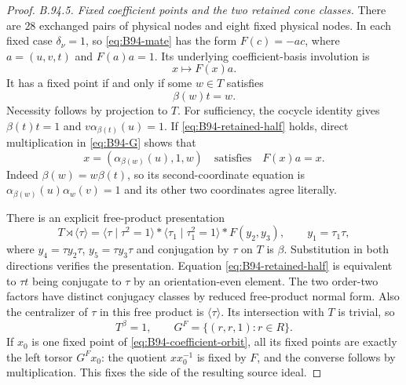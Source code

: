 \begin{proof}
\emph{B.94.5. Fixed coefficient points and the two retained cone classes.}
There are $28$ exchanged pairs of physical nodes and eight
fixed physical nodes. In each fixed case $\delta_\nu=1$,
so \eqref{eq:B94-mate} has the form $F(c)=-a c$, where
$a=(u,v,t)$ and $F(a)a=1$. Its underlying coefficient-basis
involution is
\begin{equation}\label{eq:B94-coefficient-orbit}
                              x\longmapsto F(x)a.
\end{equation}
It has a fixed point if and only if some $w\in T$ satisfies
\begin{equation}\label{eq:B94-retained-half}
                              \beta(w)t=w.
\end{equation}
Necessity follows by projection to $T$. For sufficiency, the
cocycle identity gives
$\beta(t)t=1$ and $v\alpha_{\beta(t)}(u)=1$.
If \eqref{eq:B94-retained-half} holds, direct multiplication
in \eqref{eq:B94-G} shows that
\[
                              x=(\alpha_{\beta(w)}(u),1,w)
                              \quad\text{satisfies}\quad F(x)a=x.
\]
Indeed $\beta(w)=w\beta(t)$, so its second-coordinate equation
is $\alpha_{\beta(w)}(u)\alpha_w(v)=1$ and its other two
coordinates agree literally.

There is an explicit free-product presentation
\begin{equation}\label{eq:B94-retained-orbifold}
 T\rtimes\langle\tau\rangle
    =\langle\tau\mid\tau^2=1\rangle*
      \langle\tau_1\mid\tau_1^2=1\rangle*F(y_2,y_3),
 \qquad y_1=\tau_1\tau,
\end{equation}
where $y_4=\tau y_2\tau$, $y_5=\tau y_3\tau$ and conjugation
by $\tau$ on $T$ is $\beta$. Substitution in both directions
verifies the presentation. Equation \eqref{eq:B94-retained-half}
is equivalent to $\tau t$ being conjugate to $\tau$ by an
orientation-even element. The two order-two factors have
distinct conjugacy classes by reduced free-product normal form.
Also the centralizer of $\tau$ in this free product is
$\langle\tau\rangle$. Its intersection with $T$ is trivial,
so
\begin{equation}\label{eq:B94-fixed-G}
                    T^\beta=1,
                    \qquad G^F=\{(r,r,1):r\in R\}.
\end{equation}
If $x_0$ is one fixed point of \eqref{eq:B94-coefficient-orbit},
all its fixed points are exactly the left torsor $G^F x_0$:
the quotient $x x_0^{-1}$ is fixed by $F$, and the converse
follows by multiplication. This fixes the side of the resulting
source ideal.


\end{proof}
